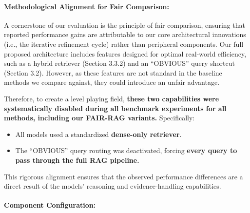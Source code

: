 \documentclass[11pt]{article}
\begin{document}
\paragraph{Methodological Alignment for Fair Comparison:}

A cornerstone of our evaluation is the principle of fair comparison, ensuring that reported performance gains are attributable to our core architectural innovations (i.e., the iterative refinement cycle) rather than peripheral components. Our full proposed architecture includes features designed for optimal real-world efficiency, such as a hybrid retriever (Section 3.3.2) and an ``OBVIOUS'' query shortcut (Section 3.2). However, as these features are not standard in the baseline methods we compare against, they could introduce an unfair advantage.

Therefore, to create a level playing field, \textbf{these two capabilities were systematically disabled during all benchmark experiments for all methods, including our FAIR-RAG variants.} Specifically:

\begin{itemize}
    \item All models used a standardized \textbf{dense-only retriever}.
    \item The ``OBVIOUS'' query routing was deactivated, forcing \textbf{every query to pass through the full RAG pipeline.}
\end{itemize}

This rigorous alignment ensures that the observed performance differences are a direct result of the models' reasoning and evidence-handling capabilities.

\paragraph{Component Configuration:}
\end{document}
